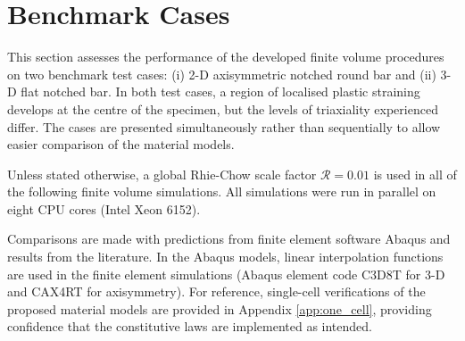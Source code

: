 \documentclass[sn-mathphys,Numbered,draft]{sn-jnl}%
\begin{document}
\section{Benchmark Cases} \label{sec:test_cases}

This section assesses the performance of the developed finite volume procedures on two benchmark test cases: (i) 2-D axisymmetric notched round bar and (ii) 3-D flat notched bar. %
In both test cases, a region of localised plastic straining develops at the centre of the specimen, but the levels of triaxiality experienced differ.
The cases are presented simultaneously rather than sequentially to allow easier comparison of the material models.

Unless stated otherwise, a global Rhie-Chow scale factor $\mathcal{R} = 0.01$ is used in all of the following finite volume simulations.
All simulations were run in parallel on eight CPU cores (Intel Xeon 6152).

Comparisons are made with predictions from finite element software Abaqus and results from the literature.
In the Abaqus models, linear interpolation functions are used in the finite element simulations (Abaqus element code C3D8T for 3-D and CAX4RT for axisymmetry).
For reference, single-cell verifications of the proposed material models are provided in Appendix \ref{app:one_cell}, providing confidence that the constitutive laws are implemented as intended.



\end{document}
